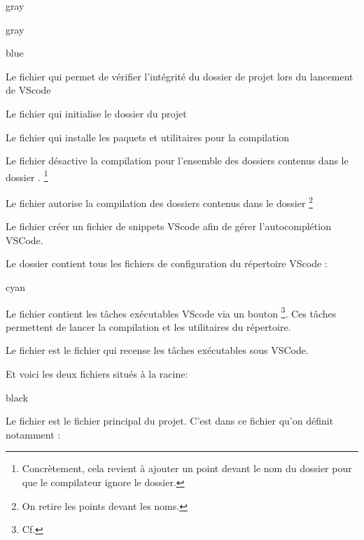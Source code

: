 {\begin{items}{gray}{\faFolder}
\begin{items}{gray}{\faFolder}
        \begin{items}{blue}{}
            \item Le fichier  qui permet de vérifier l'intégrité du dossier de projet lors du lancement de VScode
            \item Le fichier  qui initialise le dossier du projet
            \item Le fichier  qui installe les paquets et utilitaires pour la compilation
            \item Le fichier  désactive la compilation pour l'ensemble des dossiers contenus 
            dans le dossier . \footnote{Concrètement, cela revient à ajouter un point devant le nom du 
            dossier pour que le compilateur ignore le dossier.}
            \item Le fichier  autorise la compilation des dossiers contenus dans le dossier \footnote{On retire les points devant les noms.}
            \item Le fichier  créer un fichier de snippets VScode
            afin de gérer l'autocomplétion VSCode. 
        \end{items}


    \end{items}

    \item Le dossier  contient tous les fichiers de configuration du répertoire VScode : 
    \begin{items}{cyan}{}

        \item Le fichier  contient les tâches exécutables VScode via un bouton \footnote{Cf. }. Ces tâches permettent de lancer la compilation et les utilitaires du répertoire.
        \item Le fichier  est le fichier qui recense les tâches exécutables sous VSCode.
    \end{items}


    Et voici les deux fichiers situés à la racine: 
    \begin{items}{black}{\Triangle}

        \item Le fichier  est le fichier principal du projet. C'est dans ce fichier qu'on définit notamment :


\end{items}
\end{items}}
